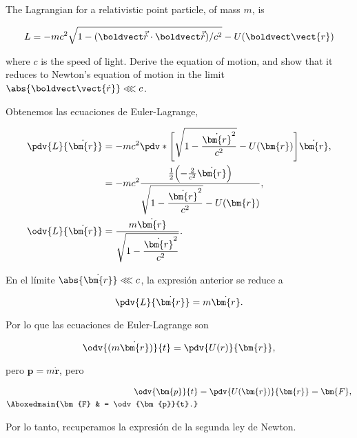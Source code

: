 \documentclass[../main.tex]{subfiles}
\begin{document}
\begin{problema}
	The Lagrangian for a relativistic point particle, of mass \(m\), is

	\begin{equation*}
		L = -mc^{2}\sqrt{1 - (\boldvect\vec{\dot{r}}\cdot \boldvect\vec{\dot{r}})/c^{2}} - U(\boldvect\vect{r})
	\end{equation*}

	where \(c\) is the speed of light. Derive the equation of motion, and
	show that it reduces to Newton's equation of motion in the limit
	\( \abs{\boldvect\vect{\dot{r}}} \lll c\).
\end{problema}

\startsolution

Obtenemos las ecuaciones de Euler-Lagrange,

\begin{align*}
	\pdv{L}{\dot{\bm{r}}} & = -mc^{2}\pdv*{\Biggl[\sqrt{1 - \dfrac{\dot{\bm{r}}^{2}}{c^{2}}} - U(\bm{r})\Biggr]}{\dot{\bm{r}}},\nonumber                             \\
	                      & = -mc^{2}\dfrac{\tfrac{1}{2}\Bigl(-\tfrac{2}{c^{2}}\dot{\bm{r}}\Bigr)}{\sqrt{1 - \dfrac{\dot{\bm{r}}^{2}}{c^{2}}} - U(\bm{r})},\nonumber \\
	\odv{L}{\dot{\bm{r}}} & = \dfrac{m \dot{\bm{r}}}{\sqrt{1 - \dfrac{\dot{\bm{r}}^{2}}{c^{2}}}}.
\end{align*}

En el límite \(\abs{\dot{\bm{r}}} \lll c\), la expresión anterior se reduce a

\begin{equation*}
	\pdv{L}{\dot{\bm{r}}} = m \dot{\bm{r}}.
\end{equation*}

Por lo que las ecuaciones de Euler-Lagrange son

\begin{equation*}
	\odv{(m \dot{\bm{r}})}{t} = \pdv{U(r)}{\bm{r}},
\end{equation*}

pero \(\bm{p} = m \dot{\bm{r}}\), pero

\begin{align*}
	\odv{\bm{p}}{t}    & = \pdv{U(\bm{r})}{\bm{r}} = \bm{F}, \\
	\Aboxedmain{\bm{F} & = \odv{\bm{p}}{t}.}
\end{align*}

Por lo tanto, recuperamos la expresión de la segunda ley de Newton.
\end{document}
